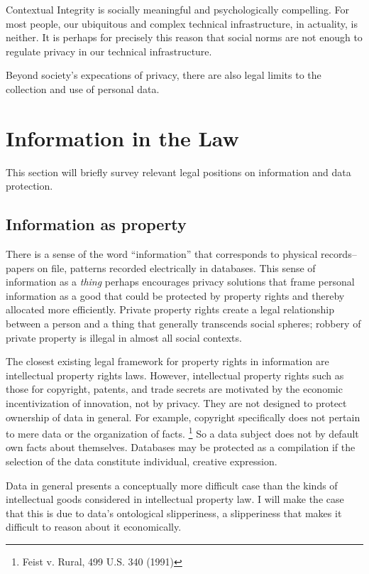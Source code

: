 \documentclass[../thesis.tex]{subfiles}
\begin{document}
Contextual Integrity is socially meaningful and
psychologically compelling.
For most people, our ubiquitous and complex
technical infrastructure, in actuality, is neither.
It is perhaps for precisely this reason that social
norms are not enough to regulate privacy in our
technical infrastructure.

Beyond society's expecations of privacy, there
are also legal limits to the collection and use
of personal data.





\section{Information in the Law}
\label{sec:law}

This section will briefly survey relevant
legal positions on information and data protection.

\subsection{Information as property}

There is a sense of the word ``information'' that
corresponds to physical records--papers on file,
patterns recorded electrically in databases.
This sense of information as a \emph{thing} perhaps encourages
privacy solutions that frame personal information as a
good that could be protected by property rights and
thereby allocated more efficiently. 
\cite{murphy1995property, samuelson2000privacy}
Private property rights create a legal relationship between
a person and a thing that generally transcends
social spheres; robbery of private property is illegal
in almost all social contexts.

The closest existing legal framework for property rights
in information are intellectual property rights laws.
However, intellectual property rights such as those
for copyright, patents, and trade secrets are motivated
by the economic incentivization of innovation, not
by privacy.
They are not designed to protect ownership of data
in general.
For example, copyright specifically does
not pertain to mere data or the organization
of facts. \footnote{Feist v. Rural, 499 U.S. 340 (1991)}
So a data subject does not by default own facts
about themselves.
Databases may be protected as a compilation if
the selection of the data constitute individual,
creative expression.

Data in general presents a conceptually more
difficult case than the kinds of intellectual
goods considered in intellectual property law.
I will make the case that this is due to data's
ontological slipperiness, a slipperiness that
makes it difficult to reason about it economically.
\end{document}
